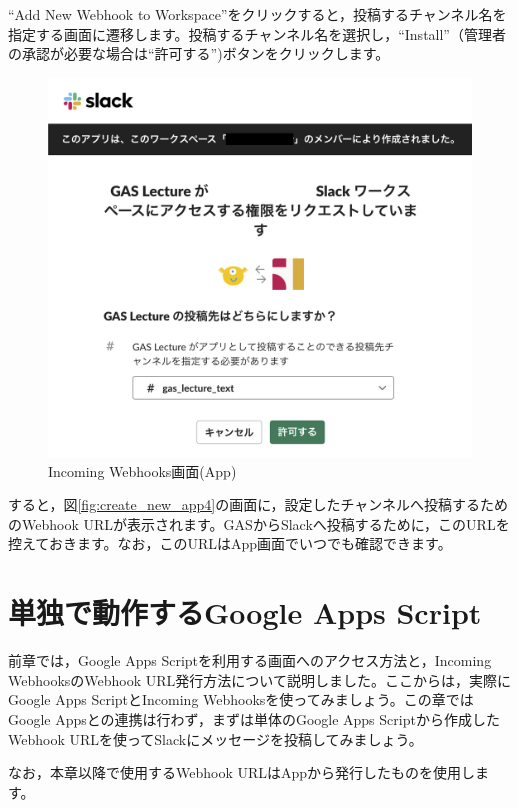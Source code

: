 \documentclass[uplatex,a4j]{jsarticle}
\begin{document}
``Add New Webhook to Workspace''をクリックすると，投稿するチャンネル名を指定する画面に遷移します。投稿するチャンネル名を選択し，``Install''（管理者の承認が必要な場合は``許可する'')ボタンをクリックします。

\begin{figure}[H]
 \centering
 \includegraphics[keepaspectratio, scale=0.6]{images/create_incoming_webhooks.png}
 \caption{Incoming Webhooks画面(App)}
 \label{fig:request_install_app}
\end{figure}

すると，図\ref{fig:create_new_app4}の画面に，設定したチャンネルへ投稿するためのWebhook URLが表示されます。GASからSlackへ投稿するために，このURLを控えておきます。なお，このURLはApp画面でいつでも確認できます。

\clearpage
\section{単独で動作するGoogle Apps Script}

前章では，Google Apps Scriptを利用する画面へのアクセス方法と，Incoming WebhooksのWebhook URL発行方法について説明しました。ここからは，実際にGoogle Apps ScriptとIncoming Webhooksを使ってみましょう。この章ではGoogle Appsとの連携は行わず，まずは単体のGoogle Apps Scriptから作成したWebhook URLを使ってSlackにメッセージを投稿してみましょう。

なお，本章以降で使用するWebhook URLはAppから発行したものを使用します。
\end{document}
